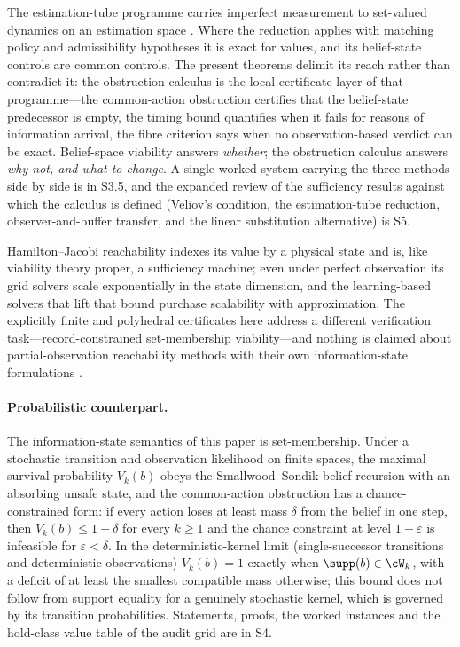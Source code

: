 The estimation-tube programme carries imperfect measurement to set-valued dynamics on an estimation space \citep{kurzhanski1997,cardaliaguet2007}. Where the reduction applies with matching policy and admissibility hypotheses it is exact for values, and its belief-state controls are common controls. The present theorems delimit its reach rather than contradict it: the obstruction calculus is the local certificate layer of that programme---the common-action obstruction certifies that the belief-state predecessor is empty, the timing bound quantifies when it fails for reasons of information arrival, the fibre criterion says when no observation-based verdict can be exact. Belief-space viability answers \emph{whether}; the obstruction calculus answers \emph{why not, and what to change}. A single worked system carrying the three methods side by side is in S3.5, and the expanded review of the sufficiency results against which the calculus is defined (Veliov's condition, the estimation-tube reduction, observer-and-buffer transfer, and the linear substitution alternative) is S5.

Hamilton--Jacobi reachability \citep{mitchell2005,margellos2011,bansal2017} indexes its value by a physical state and is, like viability theory proper, a sufficiency machine; even under perfect observation its grid solvers scale exponentially in the state dimension, and the learning-based solvers that lift that bound \citep{bansal2021} purchase scalability with approximation. The explicitly finite and polyhedral certificates here address a different verification task---record-constrained set-membership viability---and nothing is claimed about partial-observation reachability methods with their own information-state formulations \citep{chatterjee2009}.

\paragraph{Probabilistic counterpart.} The information-state semantics of this paper is set-membership. Under a stochastic transition and observation likelihood on finite spaces, the maximal survival probability $V_k(b)$ obeys the Smallwood--Sondik belief recursion with an absorbing unsafe state, and the common-action obstruction has a chance-constrained form: if every action loses at least mass $\delta$ from the belief in one step, then $V_k(b)\le1-\delta$ for every $k\ge1$ and the chance constraint at level $1-\varepsilon$ is infeasible for $\varepsilon<\delta$. In the deterministic-kernel limit (single-successor transitions and deterministic observations) $V_k(b)=1$ exactly when $\supp(b)\in\cW_k$, with a deficit of at least the smallest compatible mass otherwise; this bound does not follow from support equality for a genuinely stochastic kernel, which is governed by its transition probabilities. Statements, proofs, the worked instances and the hold-class value table of the audit grid are in S4.

